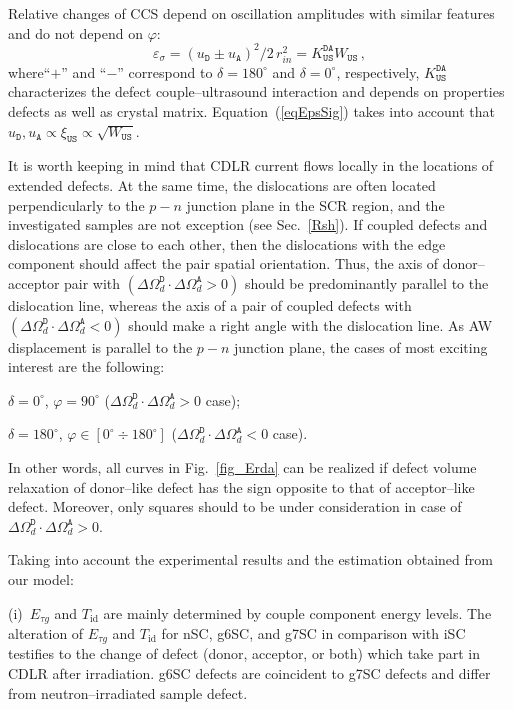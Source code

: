 \documentclass[aip,jap, amsmath,amssymb,reprint]{revtex4-1}
\begin{document}
Relative changes of CCS depend on oscillation amplitudes with similar features and
do not depend on $\varphi$:
\begin{equation}
\label{eqEpsSig}
\varepsilon_{\sigma}=(u_\mathtt{D}\pm u_\mathtt{A})^2/2\,r_{in}^2=K_\mathtt{US}^\mathtt{DA}W_{\mathtt{US}}\,,
\end{equation}
where``$+$'' and ``$-$'' correspond to $\delta=180^\circ$ and $\delta=0^\circ$, respectively,
$K_\mathtt{US}^\mathtt{DA}$ characterizes the defect couple--ultrasound interaction and depends on properties defects as well as crystal matrix.
Equation~(\ref{eqEpsSig}) takes into account that $u_\mathtt{D},u_\mathtt{A}\propto \xi_\mathtt{US}\propto\sqrt{W_\mathtt{US}}$.


It is worth keeping in mind that
CDLR current flows locally in the locations of extended defects.\cite{CDLR:JAP,CDLR:SSP}
At the same time, the dislocations are often located perpendicularly to the $p-n$ junction plane in the SCR region,
and the investigated samples are not exception (see Sec.~\ref{Rsh}).
If coupled defects and dislocations are close to each other, then the dislocations with the edge component should affect the pair spatial orientation.
Thus, the axis of donor--acceptor pair with $(\Delta\Omega_d^\mathtt{D}\cdot\Delta\Omega_d^\mathtt{A}>0)$  should be predominantly parallel to the dislocation line,
whereas the axis of a pair of coupled defects with $(\Delta\Omega_d^\mathtt{D}\cdot\Delta\Omega_d^\mathtt{A}<0)$ should make a right angle with the dislocation line.
As AW displacement is parallel to the $p-n$ junction plane,
the cases of most exciting interest are the following:

\noindent  $\delta=0^\circ$, $\varphi=90^\circ$ ($\Delta\Omega_d^\mathtt{D}\cdot\Delta\Omega_d^\mathtt{A}>0$ case);

\noindent  $\delta=180^\circ$, $\varphi\in[0^\circ\div 180^\circ]$ ($\Delta\Omega_d^\mathtt{D}\cdot\Delta\Omega_d^\mathtt{A}<0$ case).

\noindent
In other words, all curves in Fig.~\ref{fig_Erda} can be realized if defect volume relaxation of donor--like defect has the sign opposite to that of acceptor--like defect.
Moreover, only squares should to be under consideration in case of $\Delta\Omega_d^\mathtt{D}\cdot\Delta\Omega_d^\mathtt{A}>0$.

Taking into account the experimental results and the estimation obtained from our model:

\noindent
(i)~$E_{\tau g}$ and $T_{\mathrm{id}}$ are mainly determined by couple component energy levels.
The alteration of $E_{\tau g}$ and $T_{\mathrm{id}}$ for nSC, g6SC, and g7SC in comparison with iSC testifies to the change of defect (donor, acceptor, or both)
which take part in CDLR after irradiation.
g6SC defects are coincident to g7SC defects and differ from neutron--irradiated sample defect.
\end{document}
